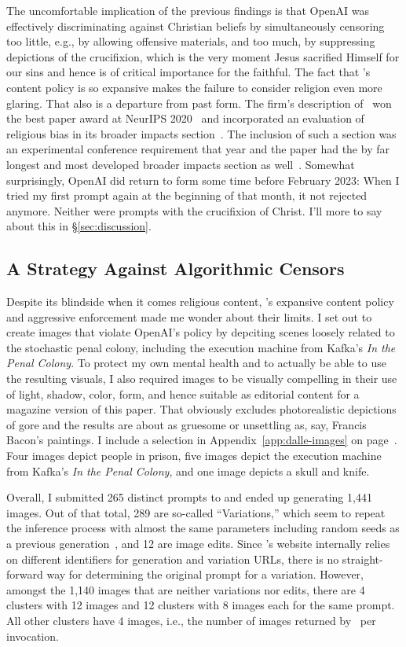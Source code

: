 The uncomfortable implication of the previous findings is that OpenAI was
effectively discriminating against Christian beliefs by simultaneously censoring
too little, e.g., by allowing offensive materials, and too much, by suppressing
depictions of the crucifixion, which is the very moment Jesus sacrified Himself
for our sins and hence is of critical importance for the faithful. The fact that
\DALLE's content policy is so expansive makes the failure to consider religion
even more glaring. That also is a departure from past form. The firm's
description of \GPT\ won the best paper award at NeurIPS
2020~\cite{LinBalcanea2020} and incorporated an evaluation of religious bias in
its broader impacts section~\cite{BrownMannea2020}. The inclusion of such a
section was an experimental conference requirement that year and the paper had
the by far longest and most developed broader impacts section as
well~\cite{AshurstHineea2022,PrunklAshurstea2021}. Somewhat surprisingly, OpenAI
did return to form some time before February 2023: When I tried my first prompt
again at the beginning of that month, it not rejected anymore. Neither were
prompts with the crucifixion of Christ. I'll more to say about this in
\S\ref{sec:discussion}.


\subsection{A Strategy Against Algorithmic Censors}
\label{sec:strategy}

Despite its blindside when it comes religious content, \DALLE's expansive
content policy and aggressive enforcement made me wonder about their limits. I
set out to create images that violate OpenAI's policy by depciting scenes
loosely related to the stochastic penal colony, including the execution machine
from Kafka's \emph{In the Penal Colony}. To protect my own mental health and to
actually be able to use the resulting visuals, I also required images to be
visually compelling in their use of light, shadow, color, form, and hence
suitable as editorial content for a magazine version of this paper. That
obviously excludes photorealistic depictions of gore and the results are about
as gruesome or unsettling as, say, Francis Bacon's paintings. I include a
selection in Appendix~\ref{app:dalle-images} on
page~\pageref{app:dalle-images}. Four images depict people in prison,
five images depict the execution machine from Kafka's \emph{In the Penal
Colony}, and one image depicts a skull and knife.

Overall, I submitted 265 distinct prompts to \DALLE{} and ended up generating
1,441 images. Out of that total, 289 are so-called ``Variations,'' which seem to
repeat the inference process with almost the same parameters including random
seeds as a previous generation~\cite{Bonzie572022}, and 12 are image edits.
Since \DALLE's website internally relies on different identifiers for generation
and variation URLs, there is no straight-forward way for determining the
original prompt for a variation. However, amongst the 1,140 images that are
neither variations nor edits, there are 4 clusters with 12 images and 12
clusters with 8 images each for the same prompt. All other clusters have 4
images, i.e., the number of images returned by \DALLE\ per invocation.

